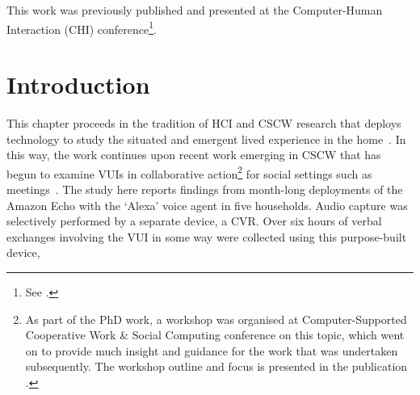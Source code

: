This work was previously published and presented at the Computer-Human Interaction (CHI) conference\footnote{See \citet{Porcheron2018}.}.






\section{Introduction}\label{sec:empirical home introduction}
This chapter proceeds in the tradition of \acf{HCI} and \acf{CSCW} research that deploys technology to study the situated and emergent lived experience in the home~\citep{Tolmie2008a,Rooksby2015}.
In this way, the work continues upon recent work emerging in \ac{CSCW} that has begun to examine \acp{VUI} in collaborative action\footnote{As part of the PhD work, a workshop was organised at Computer-Supported Cooperative Work \& Social Computing conference on this topic, which went on to provide much insight and guidance for the work that was undertaken subsequently.
The workshop outline and focus is presented in the publication \citet{Porcheron2017a}.} for social settings such as meetings~\citep{McGregor2017}.
The study here reports findings from month-long deployments of the Amazon Echo with the `Alexa' voice agent in five households.
Audio capture was selectively performed by a separate device, a \acf{CVR}.
Over six hours of verbal exchanges involving the \ac{VUI} in some way were collected using this purpose-built device, 


